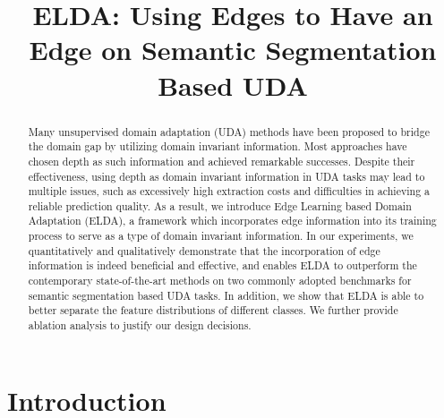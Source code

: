\documentclass{bmvc2k}
\title{ELDA: Using Edges to Have an Edge on Semantic Segmentation Based UDA}
\begin{document}
\maketitle

\vspace{-3em}
\begin{abstract}
Many unsupervised domain adaptation (UDA) methods have been proposed to bridge the domain gap by utilizing domain invariant information. Most approaches have chosen depth as such information and achieved remarkable successes. Despite their effectiveness, using depth as domain invariant information in UDA tasks may lead to multiple issues, such as excessively high extraction costs and difficulties in achieving a reliable prediction quality. As a result, we introduce Edge Learning based Domain Adaptation (ELDA), a framework which incorporates edge information into its training process to serve as a type of domain invariant information. In our experiments, we quantitatively and qualitatively demonstrate that the incorporation of edge information is indeed beneficial and effective, and enables ELDA to outperform the contemporary state-of-the-art methods on two commonly adopted benchmarks for semantic segmentation based UDA tasks. In addition, we show that ELDA is able to better separate the feature distributions of different classes. We further provide ablation analysis to justify our design decisions.












 \end{abstract}

\section{Introduction}
\label{sec::introduction}
\end{document}
